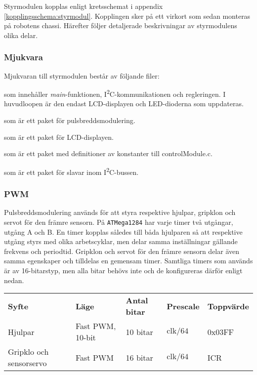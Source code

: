 \documentclass[11pt]{article}
\begin{document}
\begin{flushleft}
Styrmodulen kopplas enligt kretsschemat i appendix \ref{kopplingsschema:styrmodul}. Kopplingen sker på ett virkort som sedan monteras på robotens chassi. Härefter följer detaljerade beskrivningar av styrmodulens olika delar.

\subsubsection{Mjukvara}
Mjukvaran till styrmodulen består av följande filer:
\begin{description}[style=unboxed, leftmargin=0cm]
  \item[controlModule.c] som innehåller \textit{main}-funktionen, I\textsuperscript{2}C-kommunikationen och regleringen. I huvudloopen är den endast LCD-displayen och LED-dioderna som uppdateras.
  \item[PWM.h] som är ett paket för pulsbreddsmodulering.
  \item[LCD.h] som är ett paket för LCD-displayen.
  \item[constants.h] som är ett paket med definitioner av konstanter till controlModule.c.
  \item[I2C\_slave.h] som är ett paket för slavar inom I\textsuperscript{2}C-bussen.

\end{description}


\subsubsection{PWM}
Pulsbreddsmodulering används för att styra respektive hjulpar, gripklon och servot för den främre sensorn. På \verb+ATMega1284+ har varje timer två utgångar, utgång A och B. En timer kopplas således till båda hjulparen så att respektive utgång styrs med olika arbetscyklar, men delar samma inställningar gällande frekvens och periodtid. Gripklon och servot för den främre sensorn delar även samma egenskaper och tilldelas en gemensam timer. Samtliga timers som används är av 16-bitarstyp, men alla bitar behövs inte och de konfigureras därför enligt nedan. 

\begin{center}
\begin{tabular}{l l l l l}

    \textbf{Syfte} & \textbf{Läge} & \textbf{Antal bitar} & \textbf{Prescale} & \textbf{Toppvärde} \\
    Hjulpar & Fast PWM, 10-bit & 10 bitar & $\text{clk}/64$ &  0x03FF \\
	Gripklo och sensorservo & Fast PWM & 16 bitar & $\text{clk}/64$  & ICR \\
\end{tabular}
\end{center}


\end{flushleft}
\end{document}
